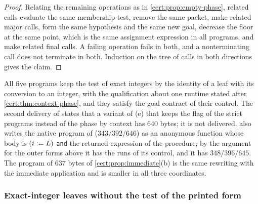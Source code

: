 \begin{proof}
Relating the remaining operations as in \cref{cert:prop:empty-phase}, related
calls evaluate the same membership test, remove the same packet, make related
major calls, form the same hypothesis and the same new goal, decrease the floor
at the same point, which is the same assignment expression in all programs, and
make related final calls. A failing operation fails in both, and a
nonterminating call does not terminate in both. Induction on the tree of calls
in both directions gives the claim.
\end{proof}

All five programs keep the test of exact integers by the identity of a leaf
with its conversion to an integer, with the qualification about one runtime
stated after \cref{cert:thm:context-phase}, and they satisfy the goal contract
of their control. The second delivery of  states
that a variant of (e) that keeps the flag of the strict programs instead of the
phase by context has $640$ bytes; it is not delivered.
 also writes the native program of
 ($343/392/646$) as an anonymous function whose body is
$(i\mathrel{:=} L)$ \texttt{and} the returned expression of the procedure; by the
argument for the outer forms above it has the runs of its control, and it has
$348/396/645$. The program of $637$ bytes of \cref{cert:prop:immediate}(b) is
the same rewriting with the immediate application and is smaller in all three
coordinates.

\subsubsection*{Exact-integer leaves without the test of the printed form}

